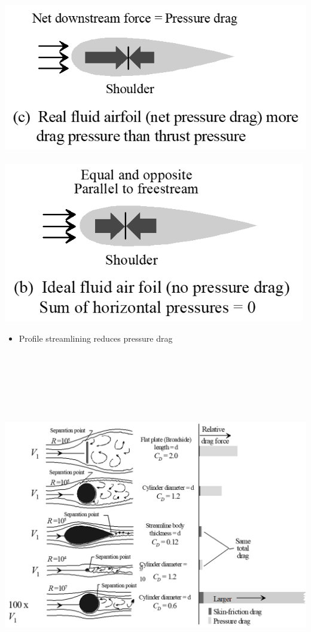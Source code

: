 \documentclass[
]{book}
\providecommand{\tightlist}{%
  \setlength{\itemsep}{0pt}\setlength{\parskip}{0pt}}
\begin{document}
\includegraphics[width=5.5in,height=2.644in]{media/05/image47.png}

\includegraphics[width=5.192in,height=2.75in]{media/05/image48.png}

\begin{itemize}
\tightlist
\item
  Profile streamlining reduces pressure drag
\end{itemize}

\includegraphics[width=8.8in,height=6in]{media/05/image49.png}
\end{document}
